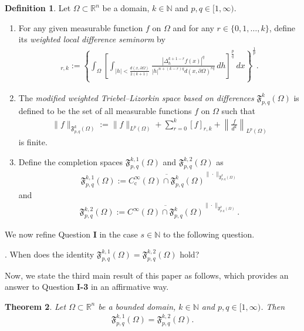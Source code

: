 \documentclass[11pt,twoside]{article}
\def\rn{{\mathbb{R}^n}}
\def\nn{{\mathbb N}}
\def\fz{\infty }
\def\boz{{\Omega}}
\def\pa{\partial}                %
\newtheorem{theorem}{Theorem}[section]
\theoremstyle{mylem}
\theoremstyle{definition}
\newtheorem{definition}[theorem]{Definition}
\numberwithin{equation}{section}
\begin{document}
\begin{definition}
Let $\Omega\subset\mathbb{R}^n$ be a domain,
$k\in\mathbb{N}$ and $p,q\in[1,\infty)$.
\begin{enumerate}
\item[\rm(i)] 
For any given measurable function $f$ on $\Omega$ and for any $r\in\{0,1,\dots,k\}$,
define its \emph{weighted local difference seminorm} by
\begin{align*}
[f]_{r,k}
:=
\left\{
\int_{\boz}
\left[
\int_{|h|<\frac{d(x,\pa\boz)}{2(k+1)}}
\frac{\left|\Delta_h^{k+1-r}f(x)\right|^q}
{|h|^{n+(k-r)q}d(x,\pa\boz)^{rq}}
\,d h
\right]^\frac{p}{q}
\,d x
\right\}^\frac{1}{p}.
\end{align*}
\item[\rm(ii)]
The \emph{modified weighted Triebel--Lizorkin space based on differences} $\mathfrak F^{k}_{p,q}(\boz)$ is defined to be the set of all measurable functions $f$ on $\boz$ such that
\begin{align}\label{diffnorm}
\|f\|_{\mathfrak F^{k}_{p,q}(\boz)}
:=
\|f\|_{L^p(\boz)}
+
\sum_{r=0}^k [f]_{r,k}
+
\left\|\frac{f}{d^k}\right\|_{L^p(\boz)}
\end{align}
is finite.
\item[\rm(iii)]
Define the completion spaces 
$\mathfrak F^{k,1}_{p,q}(\boz)$
and	$\mathfrak F^{k,2}_{p,q}(\boz)$	as
\begin{align*}
\mathfrak F^{k,1}_{p,q}(\boz)
:=
\overline{
C_{\mathrm{c}}^{\fz}(\boz)\cap \mathfrak F^{k}_{p,q}(\boz)
}^{\|\cdot\|_{\mathfrak F^{k}_{p,q}(\boz)}}
\end{align*}
and
\begin{align*}
\mathfrak F^{k,2}_{p,q}(\boz)
:=
\overline{
C^\infty(\boz)\cap \mathfrak F^{k}_{p,q}(\boz)
}^{\|\cdot\|_{\mathfrak F^{k}_{p,q}(\boz)}}.
\end{align*}
\end{enumerate}
\end{definition}

We now refine Question {\bf I} in the case $s\in\mathbb{N}$ to the following question.
\medskip 

{.
When does the identity $\mathfrak F^{k,1}_{p,q}(\boz)=\mathfrak F^{k,2}_{p,q}(\boz)$ hold?}

\medskip 

Now, we state the third main result of this paper as follows, which provides an answer to 
Question {\bf I-3} in an affirmative way.

\begin{theorem}\label{thm-third}
Let $\boz\subset\rn$ be a bounded domain, $k\in\nn$ and $p,q\in[1,\infty)$.  Then
\begin{align*}
\mathfrak F^{k,1}_{p,q}(\boz)=\mathfrak F^{k,2}_{p,q}(\boz).
\end{align*}
\end{theorem}
\end{document}
